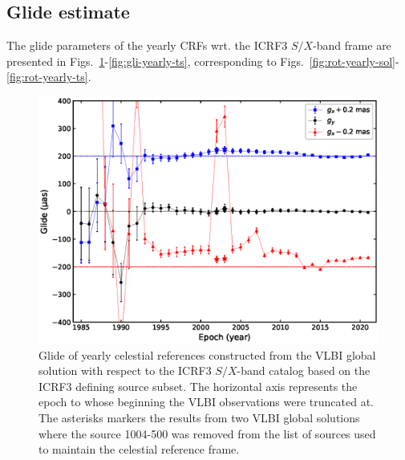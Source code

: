 \documentclass{aa}
\begin{document}
\begin{acknowledgements}
      
\end{acknowledgements}


\begin{appendix} %

\section{Glide estimate}

The glide parameters of the yearly CRFs wrt. the ICRF3 $S/X$-band frame are presented in Figs.~\ref{fig:gli-yearly-sol}-\ref{fig:gli-yearly-ts}, corresponding to Figs.~\ref{fig:rot-yearly-sol}-\ref{fig:rot-yearly-ts}.

    \begin{figure}
        \centering
        \includegraphics[width=\columnwidth]{figs/glide-from-yearly-solution}
        \caption{\label{fig:gli-yearly-sol}
        Glide of yearly celestial references constructed from the VLBI global solution with respect to the ICRF3 $S/X$-band catalog based on the ICRF3 defining source subset. 
        The horizontal axis represents the epoch to whose beginning the VLBI observations were truncated at.
        The asterisks markers the results from two VLBI global solutions where the source 1004-500 was removed from the list of sources used to maintain the celestial reference frame.
            }
    \end{figure}
    

\end{appendix}
\end{document}
